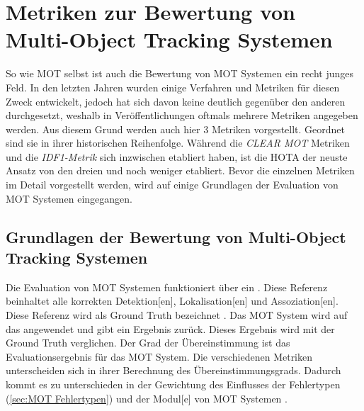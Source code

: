 \section{Metriken zur Bewertung von Multi-Object Tracking Systemen}
So wie \gls{MOT} selbst ist auch die Bewertung von \gls{MOT} Systemen ein recht junges Feld. In den letzten Jahren wurden einige Verfahren und Metriken für diesen Zweck entwickelt, jedoch hat sich davon keine deutlich gegenüber den anderen durchgesetzt, weshalb in Veröffentlichungen oftmals mehrere Metriken angegeben werden. Aus diesem Grund werden auch hier 3 Metriken vorgestellt. Geordnet sind sie in ihrer historischen Reihenfolge. Während die  \textit{\acrshort{CLEAR} \gls{MOT}} Metriken \cite{CLEAR.2008} und die \textit{\gls{IDF1}-Metrik} \cite{IDF1} sich inzwischen etabliert haben, ist die \gls{HOTA} \cite{HOTA} der neuste Ansatz von den dreien und noch weniger etabliert. Bevor die einzelnen Metriken im Detail vorgestellt werden, wird auf einige Grundlagen der Evaluation von \gls{MOT} Systemen eingegangen.

\subsection{Grundlagen der Bewertung von Multi-Object Tracking Systemen} \label{sec:MOT GT}
Die Evaluation von \gls{MOT} Systemen funktioniert über ein . Diese Referenz beinhaltet alle korrekten \gls{Detektion}[en], \gls{Lokalisation}[en] und \gls{Assoziation}[en]. Diese Referenz wird als \gls{Ground Truth} bezeichnet \cite{HOTA}. Das \gls{MOT} System wird auf das  angewendet und gibt ein Ergebnis zurück. Dieses Ergebnis wird mit der \gls{Ground Truth} verglichen. Der Grad der Übereinstimmung ist das Evaluationsergebnis für das \gls{MOT} System. Die verschiedenen Metriken unterscheiden sich in ihrer Berechnung des Übereinstimmungsgrads. Dadurch kommt es zu unterschieden in der Gewichtung des Einflusses der Fehlertypen (\autoref{sec:MOT Fehlertypen}) und der \gls{Modul}[e] von \gls{MOT} Systemen \cite{HOTA, IDF1, CLEAR.2008}.\par

